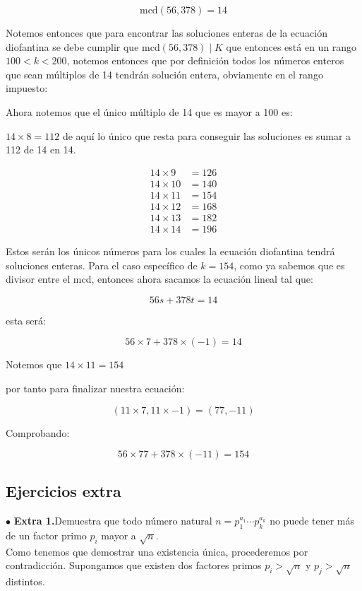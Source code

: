 \documentclass[12pt]{article}
\begin{document}
	
	\[ \text{mcd}(56, 378) = 14 \]
	
	Notemos entonces que para encontrar las soluciones enteras de la ecuación diofantina se debe cumplir que $\text{mcd}(56, 378) \mid K$ que entonces está en un rango $100 < k < 200$, notemos entonces que por definición todos los números enteros que sean múltiplos de 14 tendrán solución entera, obviamente en el rango impuesto:
	
	Ahora notemos que el único múltiplo de 14 que es mayor a 100 es:
	
	$14 \times 8 = 112$ de aquí lo único que resta para conseguir las soluciones es sumar a 112 de 14 en 14.
	
	\begin{align*}
		14 \times 9 &= 126 \\
		14 \times 10 &= 140 \\
		14 \times 11 &= 154 \\
		14 \times 12 &= 168 \\
		14 \times 13 &= 182 \\
		14 \times 14 &= 196
	\end{align*}
	
	Estos serán los únicos números para los cuales la ecuación diofantina tendrá soluciones enteras. Para el caso específico de $k = 154$, como ya sabemos que es divisor entre el mcd, entonces ahora sacamos la ecuación lineal tal que:
	
	\[ 56s + 378t = 14 \]
	
	esta será:
	
	\[ 56 \times 7 + 378 \times (-1) = 14 \]
	
	Notemos que $14 \times 11 = 154$
	
	por tanto para finalizar nuestra ecuación:
	
	\[ (11 \times 7, 11 \times -1) = (77, -11) \]
	
	Comprobando:
	
	\[ 56 \times 77 + 378 \times (-11) = 154 \]
	\vspace{1cm}
	
	\subsection*{Ejercicios extra}
	$\bullet$ \textbf{Extra 1.}Demuestra que todo número natural $n = p_1^{a_1} \cdots p_k^{a_k}$ no puede tener más de un factor primo $p_i$ mayor a $\sqrt{n}$.\\
	
	Como tenemos que demostrar una existencia única, procederemos por contradicción. Supongamos que existen dos factores primos $p_i > \sqrt{n}$ y $p_j > \sqrt{n}$ distintos.
	
\end{document}

